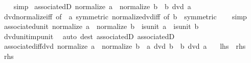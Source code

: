 \begin{isabellebody}
\ \ \isamarkupfalse%
\ simp%
\endisatagproof
{\isafoldproof}%
%
\isadelimproof
\isanewline
%
\endisadelimproof
\isanewline
{}\isamarkupfalse%
\ associatedD{}{\isacharcolon}{\kern0pt}\ {\isachardoublequoteopen}normalize\ a\ {\isacharequal}{\kern0pt}\ normalize\ b\ {\isasymLongrightarrow}\ b\ dvd\ a{\isachardoublequoteclose}\isanewline
%
\isadelimproof
\ \ %
\endisadelimproof
%
\isatagproof
{}\isamarkupfalse%
\ dvd{\isacharunderscore}{\kern0pt}normalize{\isacharunderscore}{\kern0pt}iff\ {\isacharbrackleft}{\kern0pt}of\ {\isacharunderscore}{\kern0pt}\ a{\isacharcomma}{\kern0pt}\ symmetric{\isacharbrackright}{\kern0pt}\ normalize{\isacharunderscore}{\kern0pt}dvd{\isacharunderscore}{\kern0pt}iff\ {\isacharbrackleft}{\kern0pt}of\ b\ {\isacharunderscore}{\kern0pt}{\isacharcomma}{\kern0pt}\ symmetric{\isacharbrackright}{\kern0pt}\isanewline
\ \ \isamarkupfalse%
\ simp%
\endisatagproof
{\isafoldproof}%
%
\isadelimproof
\isanewline
%
\endisadelimproof
\isanewline
{}\isamarkupfalse%
\ associated{\isacharunderscore}{\kern0pt}unit{\isacharcolon}{\kern0pt}\ {\isachardoublequoteopen}normalize\ a\ {\isacharequal}{\kern0pt}\ normalize\ b\ {\isasymLongrightarrow}\ is{\isacharunderscore}{\kern0pt}unit\ a\ {\isasymLongrightarrow}\ is{\isacharunderscore}{\kern0pt}unit\ b{\isachardoublequoteclose}\isanewline
%
\isadelimproof
\ \ %
\endisadelimproof
%
\isatagproof
{}\isamarkupfalse%
\ dvd{\isacharunderscore}{\kern0pt}unit{\isacharunderscore}{\kern0pt}imp{\isacharunderscore}{\kern0pt}unit\ \isamarkupfalse%
\ {\isacharparenleft}{\kern0pt}auto\ dest{\isacharbang}{\kern0pt}{\isacharcolon}{\kern0pt}\ associatedD{}\ associatedD{}{\isacharparenright}{\kern0pt}%
\endisatagproof
{\isafoldproof}%
%
\isadelimproof
\isanewline
%
\endisadelimproof
\isanewline
{}\isamarkupfalse%
\ associated{\isacharunderscore}{\kern0pt}iff{\isacharunderscore}{\kern0pt}dvd{\isacharcolon}{\kern0pt}\ {\isachardoublequoteopen}normalize\ a\ {\isacharequal}{\kern0pt}\ normalize\ b\ {\isasymlongleftrightarrow}\ a\ dvd\ b\ {\isasymand}\ b\ dvd\ a{\isachardoublequoteclose}\isanewline
\ \ {\isacharparenleft}{\kern0pt}\ {\isachardoublequoteopen}{\isacharquery}{\kern0pt}lhs\ {\isasymlongleftrightarrow}\ {\isacharquery}{\kern0pt}rhs{\isachardoublequoteclose}{\isacharparenright}{\kern0pt}\isanewline
%
\isadelimproof
%
\endisadelimproof
%
\isatagproof
{}\isamarkupfalse%
\isanewline
\ \ \isamarkupfalse%
\ {\isacharquery}{\kern0pt}rhs\isanewline

\end{isabellebody}
